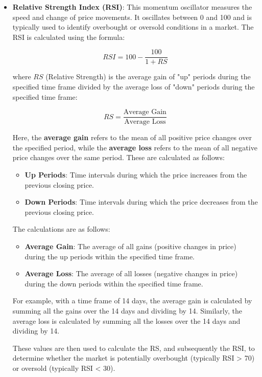 \begin{itemize}
	\item \textbf{Relative Strength Index (RSI)}: This momentum oscillator measures the speed and change of price movements. It oscillates between 0 and 100 and is typically used to identify overbought or oversold conditions in a market. The RSI is calculated using the formula:

	      \[
		      RSI = 100 - \frac{100}{1 + RS}
	      \]

	      where \( RS \) (Relative Strength) is the average gain of "up" periods during the specified time frame divided by the average loss of "down" periods during the specified time frame:

	      \[
		      RS = \frac{\text{Average Gain}}{\text{Average Loss}}
	      \]

	      Here, the \textbf{average gain} refers to the mean of all positive price changes over the specified period, while the \textbf{average loss} refers to the mean of all negative price changes over the same period. These are calculated as follows:

	      \begin{itemize}
		      \item \textbf{Up Periods}: Time intervals during which the price increases from the previous closing price.
		      \item \textbf{Down Periods}: Time intervals during which the price decreases from the previous closing price.
	      \end{itemize}

	      The calculations are as follows:

	      \begin{itemize}
		      \item \textbf{Average Gain}: The average of all gains (positive changes in price) during the up periods within the specified time frame.
		      \item \textbf{Average Loss}: The average of all losses (negative changes in price) during the down periods within the specified time frame.
	      \end{itemize}

	      For example, with a time frame of 14 days, the average gain is calculated by summing all the gains over the 14 days and dividing by 14. Similarly, the average loss is calculated by summing all the losses over the 14 days and dividing by 14.

	      These values are then used to calculate the RS, and subsequently the RSI, to determine whether the market is potentially overbought (typically RSI > 70) or oversold (typically RSI < 30).



\end{itemize}
